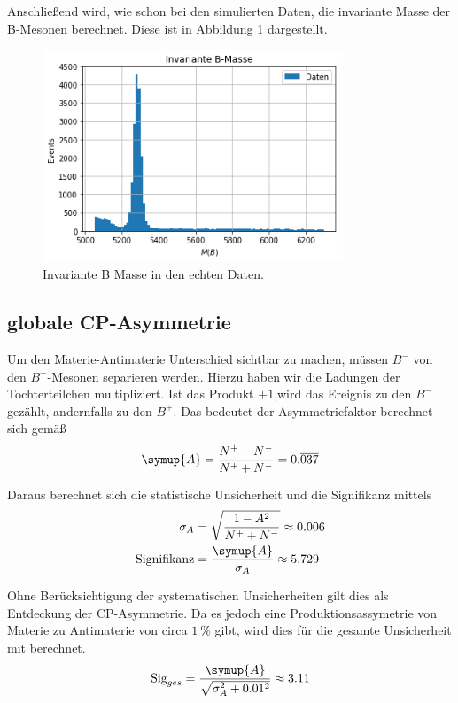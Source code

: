 Anschlie\ss end wird, wie schon bei den simulierten Daten, die invariante Masse der B-Mesonen berechnet. Diese ist in Abbildung \ref{fig:realBMass} dargestellt.

\begin{figure}[htb]
  \centering
  \includegraphics[width=0.8\textwidth]{plots/real_data_inv_masse_B.png}
  \caption{Invariante B Masse in den echten Daten.}
  \label{fig:realBMass}
\end{figure}
\newpage
\subsection{globale CP-Asymmetrie}
Um den Materie-Antimaterie Unterschied sichtbar zu machen, m\"ussen $B^{-}$ von den $B^{+}$-Mesonen separieren werden.
Hierzu haben wir die Ladungen der Tochterteilchen multipliziert.
Ist das Produkt $+1$,wird das Ereignis zu den $B^{-}$ gez\"ahlt, andernfalls zu den $B^{+}$.
Das bedeutet der Asymmetriefaktor berechnet sich gem\"a\ss
\begin{equation}
  \symup{A} = \frac{N^{+} - N^{-}}{N^{+} + N^{-}} = 0.\overline{037}
\end{equation}

Daraus berechnet sich die statistische Unsicherheit und die Signifikanz mittels
\begin{align}
  \sigma_A &= \sqrt{\frac{1 - A^2}{N^{+} + N^{-}} } \approx 0.006 \\
  \text{Signifikanz} &= \frac{\symup{A}}{\sigma_A} \approx 5.729
\end{align}

Ohne Ber\"ucksichtigung der systematischen Unsicherheiten gilt dies als Entdeckung der CP-Asymmetrie.
Da es jedoch eine Produktionsassymetrie von Materie zu Antimaterie von circa $\SI{1}{\percent}$ gibt, wird dies f\"ur die gesamte Unsicherheit mit berechnet.
\begin{equation}
  \text{Sig}_{ges} = \frac{\symup{A}}{\sqrt{\sigma_A^2 + 0.01^2}} \approx 3.11
\end{equation}

